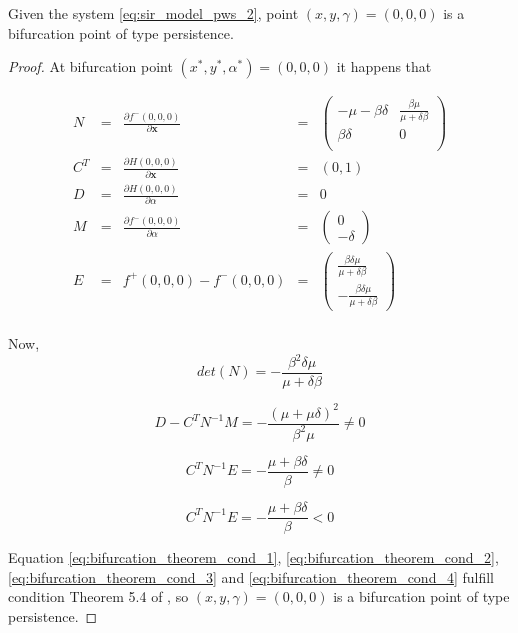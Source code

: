 \begin{theorem} Given the system \ref{eq:sir_model_pws_2}, point $(x,y,\gamma) = (0,0,0) $ is a bifurcation point of type persistence.
\end{theorem}

\begin{proof}
At bifurcation point $(x^*,y^*,\alpha^*) = (0,0,0) $ it happens that

\begin{equation}
    \begin{array}{ccccc}
        N &=& \frac{\partial f^-(0,0,0)}{\partial \textbf{x}} &=& 
        \left(
            \begin{array}{cc}
                -\mu-\beta\delta & \frac{\beta\mu}{\mu+\delta\beta} \\
                \beta\delta & 0 \\
            \end{array}
        \right) \\
        C^T &=& \frac{\partial H(0,0,0)}{\partial \textbf{x}} &=& \left(0,1\right) \\
        D &=& \frac{\partial H(0,0,0)}{\partial\alpha} &=& 0 \\
        M &=& \frac{\partial f^-(0,0,0)}{\partial\alpha} &=& \left( \begin{array}{c} 0 \\ -\delta \end{array} \right) \\
        E &=& f^+(0,0,0)-f^-(0,0,0) &=& \left( \begin{array}{c} \frac{\beta\delta\mu}{\mu+\delta\beta} \\ -\frac{\beta\delta\mu}{\mu+\delta\beta} \end{array} \right) \\
    \end{array}
\end{equation}

Now,
\begin{equation}
\label{eq:bifurcation_theorem_cond_1}
    det(N) = -\frac{\beta^2\delta\mu}{\mu+\delta\beta}
\end{equation}

\begin{equation}
\label{eq:bifurcation_theorem_cond_2}
    D-C^TN^{-1}M = -\frac{(\mu+\mu\delta)^2}{\beta^2\mu} \neq 0
\end{equation}

\begin{equation}
\label{eq:bifurcation_theorem_cond_3}
    C^TN^{-1}E = -\frac{\mu + \beta\delta}{\beta} \neq 0
\end{equation}

\begin{equation}
\label{eq:bifurcation_theorem_cond_4}
    C^TN^{-1}E = -\frac{\mu + \beta\delta}{\beta} < 0
\end{equation}

Equation \ref{eq:bifurcation_theorem_cond_1}, \ref{eq:bifurcation_theorem_cond_2}, \ref{eq:bifurcation_theorem_cond_3} and \ref{eq:bifurcation_theorem_cond_4} fulfill condition Theorem 5.4 of \cite[pp. 236]{bib:di_bernardo}, so $(x,y,\gamma) = (0,0,0) $ is a bifurcation point of type persistence.
\end{proof}